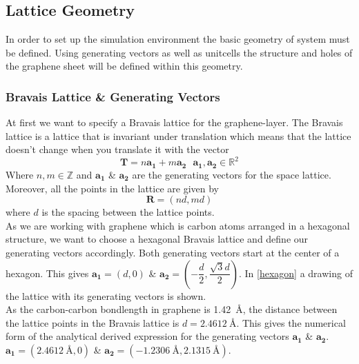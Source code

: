 \subsection{Lattice Geometry}
In order to set up the simulation environment the basic geometry of system must be defined. Using generating vectors as well as unitcells the structure and holes of the graphene sheet will be defined within this geometry.
\subsubsection{Bravais Lattice \& Generating Vectors}
At first we want to specify a Bravais lattice for the graphene-layer. The Bravais lattice is a lattice that is invariant under translation which means that the lattice doesn't change when you translate it with the vector
\begin{equation}
 \mathbf{T}=n\mathbf{a_{1}}+m\mathbf{a_{2}}\ \ \ \mathbf{a_{1}},\mathbf{a_{2}} \in \mathbb{R}^{2}
\end{equation}
Where $n,m \in \mathbb{Z}$ and $\mathbf{a_{1}}$ \& $\mathbf{a_{2}}$ are the generating vectors for the space lattice. Moreover, all the points in the lattice are given by
\begin{equation}
 \mathbf{R}=(nd,md)
\end{equation}
where $d$ is the spacing between the lattice points. \\
As we are working with graphene which is carbon atoms arranged in a hexagonal structure, we want to choose a hexagonal Bravais lattice and define our generating vectors accordingly. Both generating vectors start at the center of a hexagon. This gives $\mathbf{a_{1}}=(d,0)$ \& $\mathbf{a_{2}}=\left(-\dfrac{d}{2},\dfrac{\sqrt{3}d}{2}\right)$. In \cref{hexagon} a drawing of the lattice with its generating vectors is shown.\\
As the carbon-carbon bondlength in graphene is \SI{1.42}{\angstrom}, the distance between the lattice points  in the Bravais lattice is $d=\SI{2.4612}{\angstrom}$. This gives the numerical form of the analytical derived expression for the generating vectors  $\mathbf{a_{1}}$ \& $\mathbf{a_{2}}$. \\
$\mathbf{a_{1}}=(\SI{2.4612}{\angstrom},0)$ \& $\mathbf{a_{2}}=\left(-\SI{1.2306}{\angstrom},\SI{2.1315}{\angstrom}\right)$.
